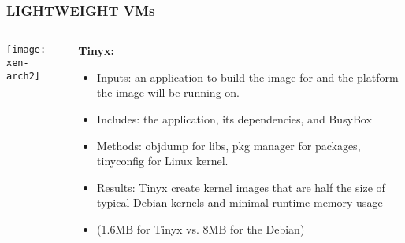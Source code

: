 \begin{frame}[plain]
	\frametitle{LIGHTWEIGHT VMs }
	
	
	
	\begin{columns}
		
		\begin{column}{.3\textwidth}
			
			\texttt{[image: xen-arch2]}
			
		\end{column}
		
		\begin{column}{.7\textwidth}
			\textbf{Tinyx: }
			\begin{itemize}			
				
				\item Inputs: an application to build the image for and the platform the image	will be running on.
				\item Includes: the application, its dependencies,	and BusyBox 
				\item Methods: objdump for libs, pkg manager for packages, tinyconfig for Linux kernel.
				\item Results:  Tinyx create kernel images that are half the size of typical		Debian kernels and minimal runtime memory usage
				\item (1.6MB for Tinyx vs. 8MB for the Debian)
				
				
			\end{itemize}
			
		\end{column}
		
		
	\end{columns}
	
	
\end{frame}

